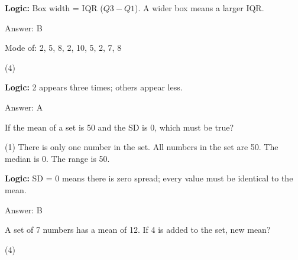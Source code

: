 \documentclass[11pt,paper=a4,answers]{exam}
\begin{document}
\begin{questions}
\begin{solution}
\textbf{Logic:} Box width = IQR ($Q3 - Q1$). A wider box means a larger IQR.


\vspace{30pt}

Answer: \colorbox{yellow!100}{B}
\end{solution}

\vspace{60pt}

\question
Mode of: 2, 5, 8, 2, 10, 5, 2, 7, 8
\begin{tasks}(4)
\end{tasks}

\begin{solution}
\textbf{Logic:} 2 appears three times; others appear less.

\vspace{30pt}

Answer: \colorbox{yellow!100}{A}
\end{solution}

\vspace{60pt}

\question
If the mean of a set is 50 and the SD is 0, which must be true?
\begin{tasks}(1)
    \task There is only one number in the set.
    \task All numbers in the set are 50.
    \task The median is 0.
    \task The range is 50.
\end{tasks}

\begin{solution}
\textbf{Logic:} SD = 0 means there is zero spread; every value must be identical to the mean.

\vspace{30pt}

Answer: \colorbox{yellow!100}{B}
\end{solution}

\vspace{60pt}

\question
A set of 7 numbers has a mean of 12. If 4 is added to the set, new mean?
\begin{tasks}(4)
\end{tasks}


\end{questions}
\end{document}
